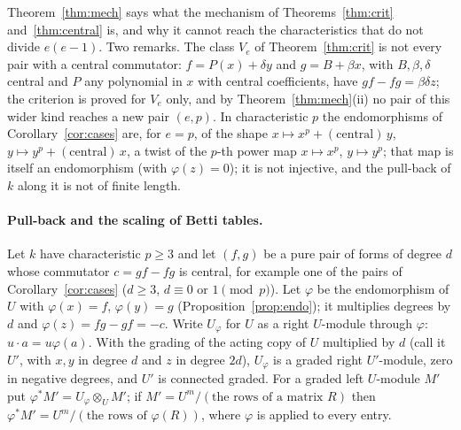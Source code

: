 \documentclass[11pt]{article}
\theoremstyle{definition}
\theoremstyle{remark}
\begin{document}
Theorem~\ref{thm:mech} says what the mechanism of Theorems~\ref{thm:crit} and~\ref{thm:central} is, and why it cannot reach the characteristics that do not divide $e(e-1)$. Two remarks. The class $V_e$ of Theorem~\ref{thm:crit} is not every pair with a central commutator: $f=P(x)+\delta y$ and $g=B+\beta x$, with $B,\beta,\delta$ central and $P$ any polynomial in $x$ with central coefficients, have $gf-fg=\beta\delta z$; the criterion is proved for $V_e$ only, and by Theorem~\ref{thm:mech}(ii) no pair of this wider kind reaches a new pair $(e,p)$. In characteristic $p$ the endomorphisms of Corollary~\ref{cor:cases} are, for $e=p$, of the shape $x\mapsto x^p+(\text{central})\,y$, $y\mapsto y^p+(\text{central})\,x$, a twist of the $p$-th power map $x\mapsto x^p$, $y\mapsto y^p$; that map is itself an endomorphism (with $\varphi(z)=0$); it is not injective, and the pull-back of $k$ along it is not of finite length.

\paragraph{Pull-back and the scaling of Betti tables.} Let $k$ have characteristic $p\ge3$ and let $(f,g)$ be a pure pair of forms of degree $d$ whose commutator $c=gf-fg$ is central, for example one of the pairs of Corollary~\ref{cor:cases} ($d\ge3$, $d\equiv0$ or $1\pmod p$). Let $\varphi$ be the endomorphism of $U$ with $\varphi(x)=f$, $\varphi(y)=g$ (Proposition~\ref{prop:endo}); it multiplies degrees by $d$ and $\varphi(z)=fg-gf=-c$. Write $U_\varphi$ for $U$ as a right $U$-module through $\varphi$: $u\cdot a=u\varphi(a)$. With the grading of the acting copy of $U$ multiplied by $d$ (call it $U'$, with $x,y$ in degree $d$ and $z$ in degree $2d$), $U_\varphi$ is a graded right $U'$-module, zero in negative degrees, and $U'$ is connected graded. For a graded left $U$-module $M'$ put $\varphi^*M'=U_\varphi\otimes_UM'$; if $M'=U^m/(\text{the rows of a matrix }R)$ then $\varphi^*M'=U^m/(\text{the rows of }\varphi(R))$, where $\varphi$ is applied to every entry.
\end{document}

